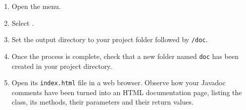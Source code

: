 \begin{enumerate}
        \begin{enumerate}

            \item Open the  menu.

            \item Select .

            \item Set the output directory to your project folder followed by \texttt{/doc}.

            \item Once the process is complete, check that a new folder named \texttt{doc} has been created in your project directory.

            \item Open its \texttt{index.html} file in a web browser. Observe how your Javadoc comments have been turned into an HTML documentation page, listing the class, its methods, their parameters and their return values.

        \end{enumerate}

\end{enumerate}
